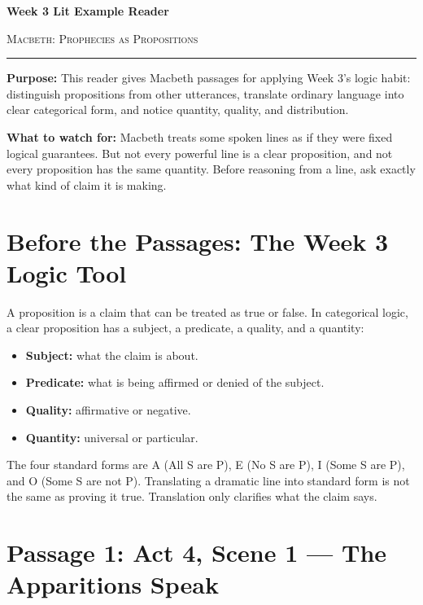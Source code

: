 \documentclass[12pt]{article}
\begin{document}
\begin{center}
{\LARGE\bfseries Week 3 Lit Example Reader}\par\vspace{0.05em}
{\large\scshape Macbeth: Prophecies as Propositions}\par\vspace{0.15em}
\rule{0.78\textwidth}{0.5pt}
\end{center}

\begin{small}
\textbf{Purpose:} This reader gives Macbeth passages for applying Week 3's logic habit: distinguish propositions from other utterances, translate ordinary language into clear categorical form, and notice quantity, quality, and distribution.

\textbf{What to watch for:} Macbeth treats some spoken lines as if they were fixed logical guarantees. But not every powerful line is a clear proposition, and not every proposition has the same quantity. Before reasoning from a line, ask exactly what kind of claim it is making.
\end{small}

\section*{Before the Passages: The Week 3 Logic Tool}

A proposition is a claim that can be treated as true or false. In categorical logic, a clear proposition has a subject, a predicate, a quality, and a quantity:

\begin{itemize}[leftmargin=1.5em,itemsep=0.2em]
\item \textbf{Subject:} what the claim is about.
\item \textbf{Predicate:} what is being affirmed or denied of the subject.
\item \textbf{Quality:} affirmative or negative.
\item \textbf{Quantity:} universal or particular.
\end{itemize}

The four standard forms are A (All S are P), E (No S are P), I (Some S are P), and O (Some S are not P). Translating a dramatic line into standard form is not the same as proving it true. Translation only clarifies what the claim says.

\section*{Passage 1: Act 4, Scene 1 --- The Apparitions Speak}
\end{document}
